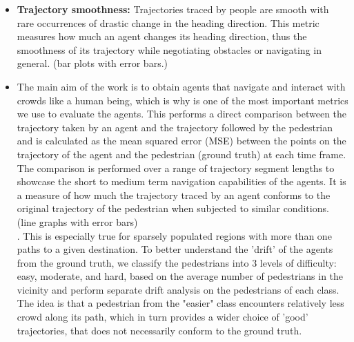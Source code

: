 \begin{itemize}
        \item \textbf{Trajectory smoothness:} Trajectories traced by people are smooth with rare occurrences of drastic change in the heading direction. This metric measures how much an agent changes its heading direction, thus the smoothness of its trajectory while negotiating obstacles or navigating in general. (bar plots with error bars.)
        \item \textbf{}The main aim of the work is to obtain agents that navigate and interact with crowds like a human being, which is why  is one of the most important metrics we use to evaluate the agents. This performs a direct comparison between the trajectory taken by an agent and the trajectory followed by the pedestrian and is calculated as the mean squared error (MSE) between the points on the trajectory of the agent and the pedestrian (ground truth) at each time frame. The comparison is performed over a range of trajectory segment lengths to showcase the short to medium term navigation capabilities of the agents. It is a measure of how much the trajectory traced by an agent conforms to the original trajectory of the pedestrian when subjected to similar conditions. (line graphs with error bars)\\
        . This is especially true for sparsely populated regions with more than one paths to a given destination. To better understand the 'drift' of the agents from the ground truth, we classify the pedestrians into 3 levels of difficulty: easy, moderate, and hard, based on the average number of pedestrians in the vicinity and perform separate drift analysis on the pedestrians of each class. The idea is that a pedestrian from the "easier" class encounters relatively less crowd along its path, which in turn provides a wider choice of 'good' trajectories, that does not necessarily conform to the ground truth.
\end{itemize}

